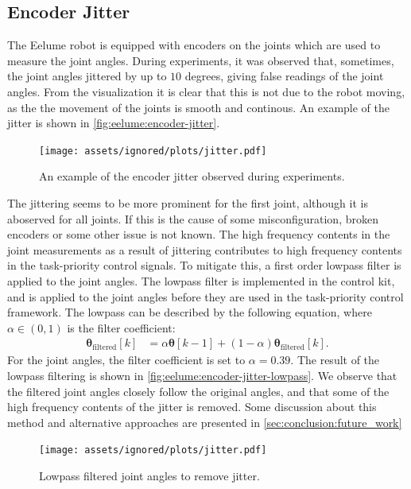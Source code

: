 \subsection*{Encoder Jitter}
The Eelume robot is equipped with encoders on the joints which are used to measure the joint angles.
During experiments, it was observed that, sometimes, the joint angles jittered by up to \(10\) degrees,
giving false readings of the joint angles. From the visualization it is clear that this is not due to the robot moving,
as the the movement of the joints is smooth and continous. An example of the jitter is shown in \autoref{fig:eelume:encoder-jitter}.
\begin{figure}[h!]
    \centering
    \texttt{[image: assets/ignored/plots/jitter.pdf]}
    \caption{An example of the encoder jitter observed during experiments.}
    \label{fig:eelume:encoder-jitter}
\end{figure}
The jittering seems to be more prominent for the first joint, although it is aboserved for all joints.
If this is the cause of some misconfiguration, broken encoders or some other issue is not known.
The high frequency contents in the joint measurements as a result of jittering
contributes to high frequency contents in the task-priority control signals. To
mitigate this, a first order lowpass filter is applied to the joint angles. The
lowpass filter is implemented in the control kit, and is applied to the joint angles before
they are used in the task-priority control framework. The lowpass can be
described by the following equation, where \(\alpha \in (0, 1)\) is the filter coefficient:
\begin{align}
    \bm{\theta}_{\textrm{filtered}}[k] &= \alpha \bm{\theta}[k-1] + (1 - \alpha)\bm{\theta}_{\text{filtered}}[k].
\end{align}
For the joint angles, the filter coefficient is set to \(\alpha = 0.39\). The
result of the lowpass filtering is shown in \autoref{fig:eelume:encoder-jitter-lowpass}.
We observe that the filtered joint angles closely follow the original angles,
and that some of the high frequency contents of the jitter is removed. Some discussion
about this method and alternative approaches are presented in \autoref{sec:conclusion:future_work}
\begin{figure}[h!]
    \centering
    \texttt{[image: assets/ignored/plots/jitter.pdf]}
    \caption{Lowpass filtered joint angles to remove jitter.}
    \label{fig:eelume:encoder-jitter-lowpass}
\end{figure}

